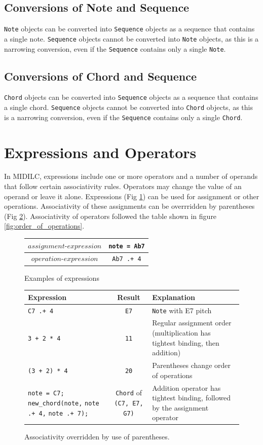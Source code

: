 \documentclass[12pt,A4]{book}
\begin{document}
\subsection{Conversions of Note and Sequence}
\verb|Note| objects can be converted into \verb|Sequence| objects as a sequence that contains a single note. \verb|Sequence| objects cannot be converted into \verb|Note| objects, as this is a narrowing conversion, even if the \verb|Sequence| contains only a single \verb|Note|.
\subsection{Conversions of Chord and Sequence}
\verb|Chord| objects can be converted into \verb|Sequence| objects as a sequence that contains a single chord. \verb|Sequence| objects cannot be converted into \verb|Chord| objects, as this is a narrowing conversion, even if the \verb|Sequence| contains only a single \verb|Chord|.
\section{Expressions and Operators}

In MIDILC, expressions include one or more operators and a number of operands that follow certain associativity rules. Operators may change the value of an operand or leave it alone. Expressions (Fig \ref{fig:expressions}) can be used for assignment or other operations. Associativity of these assignments can be overrridden by parentheses (Fig \ref{fig:associativity}). Associativity of operators followed the table shown in figure \ref{fig:order_of_operations}.

\begin{figure}
\center
\begin{tabular}{|c|c|}
\hline
$assignment\mbox{-}expression$  & \verb|note = Ab7| \\ \hline
$operation\mbox{-}expression$   & \verb|Ab7 .+ 4| \\ \hline
\end{tabular}
\label{fig:expressions}
\caption{Examples of expressions}
\end{figure}

\begin{figure}
\center
\begin{tabular}{|p{}|c|p{}|}
\hline
Expression & Result & Explanation \\ \hline
\verb|C7 .+ 4| & \verb|E7| & \verb|Note| with E7 pitch \\ \hline
\verb|3 + 2 * 4| & \verb|11| &	Regular assignment order (multiplication has tightest binding, then addition) \\ \hline
\verb|(3 + 2) * 4| &\verb|20| & Parentheses change order of operations \\ \hline
\verb|note = C7;| \verb|new_chord(note,| \verb|note .+ 4,| \verb|note .+ 7);| & \verb|Chord| of \verb|(C7, E7, G7)| & Addition operator has tightest binding, followed by the assignment operator \\ \hline
\end{tabular}
\label{fig:associativity}
\caption{Associativity overridden by use of parentheses.}
\end{figure}
\end{document}
